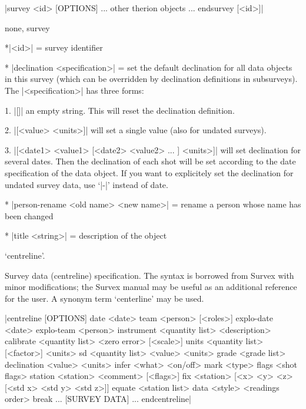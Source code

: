 \enddescription

\syntax
      |survey <id> [OPTIONS]
       ... other therion objects ...
       endsurvey [<id>]|
\endsyntax

\context
  none, survey
\endcontext

\arguments
*|<id>| = survey identifier
\endarguments

\options 
* |declination <specification>| = set the default declination for 
  all data objects in this survey (which can be overridden by
  declination definitions in subsurveys). The |<specification>| 
  has three forms:

  1. |[]| an empty string. This will reset the declination definition.

  2. |[<value> <units>]| will set a single value (also for undated surveys).

  3. |[<date1> <value1> [<date2> <value2> ... ] <units>]| 
     will set declination for several dates. Then the declination
     of each shot will be set according to the date specification
     of the data object. If you want to explicitely set the declination
     for undated survey data, use `|-|' instead of date.

* |person-rename <old name> <new name>| = rename a person whose name has been
  changed

* |title <string>| = description of the object
\endoptions




\subsubchapter `centreline'.

\description
  Survey data (centreline) specification. The syntax is borrowed from Survex 
  with minor modifications; the Survex manual may be useful as an additional
  reference for the user. A synonym term `centerline' may be used.
\enddescription

\syntax
      |centreline [OPTIONS]
          date <date>
          team <person> [<roles>]
          explo-date <date>
          explo-team <person>
          instrument <quantity list> <description>
          calibrate <quantity list> <zero error> [<scale>]
          units <quantity list> [<factor>] <units>
          sd <quantity list> <value> <units>
          grade <grade list>
          declination <value> <units>
          infer <what> <on/off>
          mark <type>
          flags <shot flags>
          station <station> <comment> [<flags>]
          fix <station> [<x> <y> <z> [<std x> <std y> <std z>]]
          equate <station list>
          data <style> <readings order>
          break
          ...
          [SURVEY DATA]
          ...
        endcentreline|
\endsyntax


